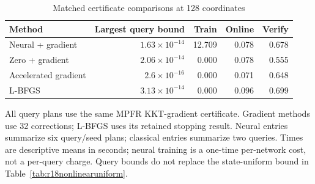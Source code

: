 \begin{table}[t]
\centering\small
\caption{Matched certificate comparisons at 128 coordinates}\label{tab:r18nonlinearcomparisons}
\begin{tabular}{lrrrr}
\toprule
Method & Largest query bound & Train & Online & Verify\\
\midrule
Neural + gradient & $1.63\times10^{-14}$ & 12.709 & 0.078 & 0.678\\
Zero + gradient & $2.06\times10^{-14}$ & 0.000 & 0.078 & 0.555\\
Accelerated gradient & $2.6\times10^{-16}$ & 0.000 & 0.071 & 0.648\\
L-BFGS & $3.13\times10^{-14}$ & 0.000 & 0.096 & 0.699\\
\bottomrule
\end{tabular}
\par\smallskip\begin{minipage}{.98\linewidth}\footnotesize All query plans use the same MPFR KKT-gradient certificate. Gradient methods use 32 corrections; L-BFGS uses its retained stopping result. Neural entries summarize six query/seed plans; classical entries summarize two queries. Times are descriptive means in seconds; neural training is a one-time per-network cost, not a per-query charge. Query bounds do not replace the state-uniform bound in Table~\ref{tab:r18nonlinearuniform}.\end{minipage}
\end{table}
